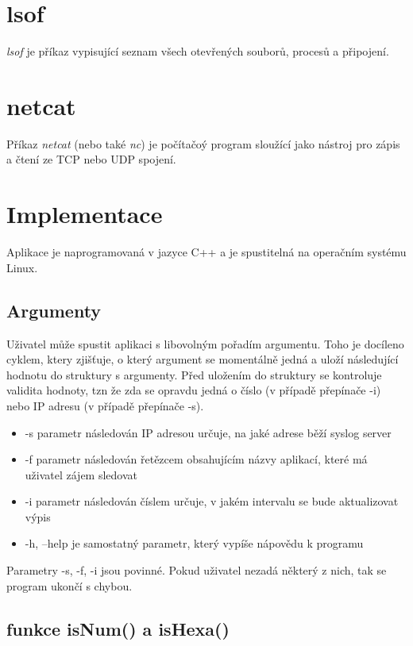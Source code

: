\documentclass[a4paper]{article}
\begin{document}
	\section{lsof}

	\emph{lsof} je příkaz vypisující seznam všech otevřených souborů, procesů a připojení.

	\section{netcat}

	Příkaz \emph{netcat} (nebo také \emph{nc}) je počítačoý program sloužící jako nástroj pro zápis a čtení ze TCP nebo UDP spojení.

	\section{Implementace}
	\begin{sloppypar}
	Aplikace je naprogramovaná v jazyce C++ a je spustitelná na operačním systému Linux.
	\end{sloppypar}

	\subsection{Argumenty}
	\begin{sloppypar}
	Uživatel může spustit aplikaci s libovolným pořadím argumentu. Toho je docíleno cyklem, ktery zjišťuje, o který argument se momentálně jedná a uloží následující hodnotu do struktury s argumenty. Před uložením do struktury se kontroluje validita hodnoty, tzn že zda se opravdu jedná o číslo (v případě přepínače -i) nebo IP adresu (v případě přepínače -s).
	\end{sloppypar}
	\begin{itemize}
		\item -s parametr následován IP adresou určuje, na jaké adrese běží syslog server
		\item -f parametr následován řetězcem obsahujícím názvy aplikací, které má uživatel zájem sledovat
		\item -i parametr následován číslem určuje, v jakém intervalu se bude aktualizovat výpis
		\item -h, --help je samostatný parametr, který vypíše nápovědu k programu
	\end{itemize}
	Parametry -s, -f, -i jsou povinné. Pokud uživatel nezadá některý z nich, tak se program ukončí s chybou.

	\subsection{funkce isNum() a isHexa()}
\end{document}
